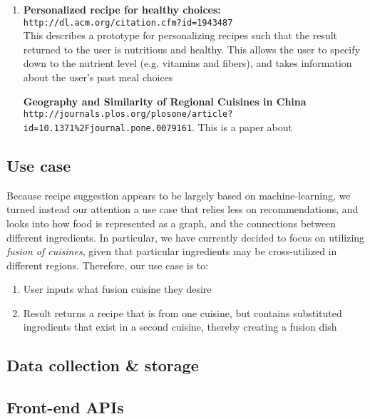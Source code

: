 \documentclass{article}
\begin{document}
\begin{enumerate}
    \item
    \textbf{Personalized recipe for healthy choices:} \texttt{http://dl.acm.org/citation.cfm?id=1943487} \\
    This describes a prototype for personalizing recipes such that the result returned to the user
    is nutritious and healthy. This allows the user to specify down to the nutrient level (e.g. vitamins and fibers),
    and takes information about the user's past meal choices 
    
    \textbf{Geography and Similarity of Regional Cuisines in China} \\
    \texttt{http://journals.plos.org/plosone/article?id=10.1371\%2Fjournal.pone.0079161}.
    This is a paper about
    
\end{enumerate}

\subsection{Use case} 
Because recipe suggestion appears to be largely based on machine-learning, we turned instead
our attention a use case that relies less on recommendations, and looks into how 
food is represented as a graph, and the connections between different ingredients. In particular,
we have currently decided to focus on utilizing \textit{fusion of cuisines}, given that
particular ingredients may be cross-utilized in different regions. Therefore, our use case is to:
\begin{enumerate}
    \item User inputs what fusion cuisine they desire 
    \item Result returns a recipe that is from one cuisine, but contains substituted ingredients that 
        exist in a second cuisine, thereby creating a fusion dish 
\end{enumerate}


\subsection{Data collection \& storage} 

\subsection{Front-end APIs}
\end{document}
